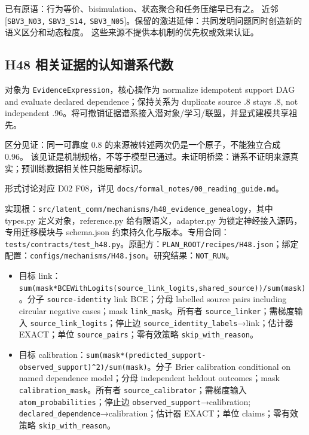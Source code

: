 \documentclass[
  10pt,
]{article}
\begin{document}
已有原语：行为等价、bisimulation、状态聚合和任务压缩早已有之。 近邻
{[}\nolinkurl{SBV3_N03,} \nolinkurl{SBV3_S14,}
\nolinkurl{SBV3_N05}{]}。保留的激进延伸：共同发明问题同时创造新的语义区分和动态粒度。
这些来源不提供本机制的优先权或效果认证。

\subsection{H48
相关证据的认知谱系代数}\label{h48-ux76f8ux5173ux8bc1ux636eux7684ux8ba4ux77e5ux8c31ux7cfbux4ee3ux6570}

对象为 \nolinkurl{EvidenceExpression}，核心操作为 normalize idempotent
support DAG and evaluate declared dependence；保持关系为 duplicate
source .8 stays .8, not independent
.96。将可撤销证据谱系接入潜对象/学习/联盟，并显式建模共享祖先。

区分见证：同一可靠度 0.8 的来源被转述两次仍是一个原子，不能独立合成
0.96。
该见证是机制规格，不等于模型已通过。未证明桥梁：谱系不证明来源真实；预训练数据相关性只能局部标识。

形式讨论对应 D02 F08，详见
{\small\nolinkurl{docs/formal_notes/00_reading_guide.md}}。

实现根：{\small\nolinkurl{src/latent_comm/mechanisms/h48_evidence_genealogy}}，其中
types.py 定义对象，reference.py 给有限语义，adapter.py
为锁定神经接入源码，专用迁移模块与 schema.json
约束持久化与版本。专用合同：{\small\nolinkurl{tests/contracts/test_h48.py}}。原配方：{\small\nolinkurl{PLAN_ROOT/recipes/H48.json}}；绑定配置：{\small\nolinkurl{configs/mechanisms/H48.json}}。研究结果：\nolinkurl{NOT_RUN}。

\begin{itemize}
\item
  目标
  link：{\small\nolinkurl{sum(mask*BCEWithLogits(source_link_logits,shared_source))/sum(mask)}}。分子
  \nolinkurl{source-identity} link BCE；分母 labelled source pairs
  including circular negative cases；mask \nolinkurl{link_mask}。所有者
  \nolinkurl{source_linker}；需梯度输入
  \nolinkurl{source_link_logits}；停止边
  \nolinkurl{source_identity_labels}→link；估计器 EXACT；单位
  \nolinkurl{source_pairs}；零有效策略 \nolinkurl{skip_with_reason}。
\item
  目标
  calibration：{\small\nolinkurl{sum(mask*(predicted_support-observed_support)^2)/sum(mask)}}。分子
  Brier calibration conditional on named dependence model；分母
  independent heldout outcomes；mask
  \nolinkurl{calibration_mask}。所有者
  \nolinkurl{source_calibrator}；需梯度输入
  \nolinkurl{atom_probabilities}；停止边
  \nolinkurl{observed_support}→calibration;
  \nolinkurl{declared_dependence}→calibration；估计器 EXACT；单位
  claims；零有效策略 \nolinkurl{skip_with_reason}。
\end{itemize}
\end{document}
